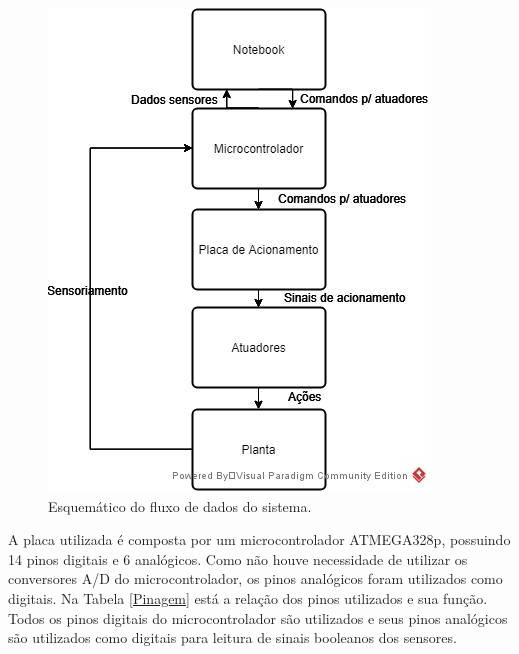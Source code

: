   \begin{figure}[htb]
	\caption{\label{diagramaHardware}Esquemático do fluxo de dados do sistema.}
	\begin{center}
	    \includegraphics[width=0.55\linewidth]{./img/Eletronicadiagrama.jpg}
	\end{center}
\end{figure}

A placa utilizada é composta por um microcontrolador ATMEGA328p, possuindo 14 pinos digitais e 6 analógicos. Como não houve necessidade de utilizar os conversores A/D do microcontrolador, os pinos analógicos foram utilizados como digitais. Na Tabela \ref{Pinagem} está a relação dos pinos utilizados e sua função. Todos os pinos digitais do microcontrolador são utilizados e seus pinos analógicos são utilizados como digitais para leitura de sinais booleanos dos sensores.

